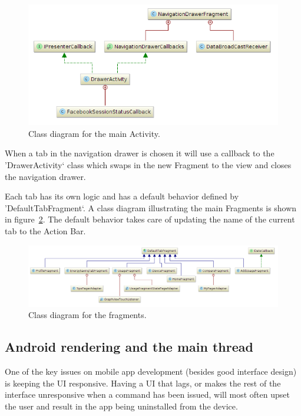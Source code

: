 \begin{figure}[H]
\includegraphics[width=\textwidth]{ch/architecture/fig/class_diagram_drawer.png}
\caption{Class diagram for the main Activity.}
\label{fig:classDiagramDrawer}
\end{figure}

When a tab in the navigation drawer is chosen it will use a callback to the 'DrawerActivity` class which swaps in the new Fragment to the view and closes the navigation drawer.

Each tab has its own logic and has a default behavior defined by 'DefaultTabFragment`. A class diagram illustrating the main Fragments is shown in figure~\ref{fig:classDiagramFragments}. The default behavior takes care of updating the name of the current tab to the Action Bar.

\begin{figure}[H]
\includegraphics[width=\textwidth]{ch/architecture/fig/class_diagram_fragments.png}
\caption{Class diagram for the fragments.}
\label{fig:classDiagramFragments}
\end{figure}

\subsection{Android rendering and the main thread}
One of the key issues on mobile app development (besides good interface design) is keeping the \gls{UI} responsive. Having a UI that lags, or makes the rest of the interface unresponsive when a command has been issued, will most often upset the user and result in the app being uninstalled from the device.

